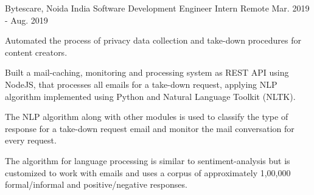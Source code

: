 \begin{cventries}
  \cventry
    {Bytescare, Noida India} %
    {Software Development Engineer Intern} %
    {Remote} %
    {Mar. 2019 - Aug. 2019} %
    {
      \begin{cvitems} %
        \item {Automated the process of privacy data collection and take-down procedures for content creators.}
        \item {Built a mail-caching, monitoring and processing system as REST API using NodeJS, that processes all emails for a take-down request, applying NLP algorithm implemented using Python and Natural Language Toolkit (NLTK).}
        \item {The NLP algorithm along with other modules is used to classify the type of response for a take-down request email and monitor the mail conversation for every request.}
        \item {The algorithm for language processing is similar to sentiment-analysis but is customized to work with emails and uses a corpus of approximately 1,00,000 formal/informal and positive/negative responses.}
      \end{cvitems}
    }
\end{cventries}
